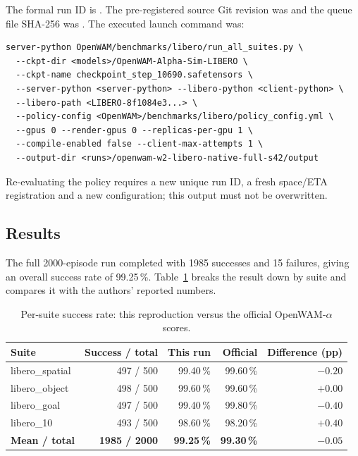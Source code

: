 The formal run ID is . The
pre-registered source Git revision was
and the queue file SHA-256 was
.
The executed launch command was:

\begin{verbatim}
server-python OpenWAM/benchmarks/libero/run_all_suites.py \
  --ckpt-dir <models>/OpenWAM-Alpha-Sim-LIBERO \
  --ckpt-name checkpoint_step_10690.safetensors \
  --server-python <server-python> --libero-python <client-python> \
  --libero-path <LIBERO-8f1084e3...> \
  --policy-config <OpenWAM>/benchmarks/libero/policy_config.yml \
  --gpus 0 --render-gpus 0 --replicas-per-gpu 1 \
  --compile-enabled false --client-max-attempts 1 \
  --output-dir <runs>/openwam-w2-libero-native-full-s42/output
\end{verbatim}

Re-evaluating the policy requires a new unique run ID, a fresh space/ETA
registration and a new configuration; this output must not be overwritten.

\subsection{Results}
\label{sec:owa-results}

The full 2000-episode run completed with 1985 successes and 15 failures, giving
an overall success rate of 99.25\,\%. Table~\ref{tab:owa-scores} breaks the
result down by suite and compares it with the authors' reported numbers.

\begin{table}[H]
  \centering
  \small
  \caption{Per-suite success rate: this reproduction versus the official
  OpenWAM-$\alpha$ scores.}
  \label{tab:owa-scores}
  \begin{tabular}{@{}lrrrr@{}}
    \toprule
    Suite & Success / total & This run & Official & Difference (pp) \\
    \midrule
    libero\_spatial & 497 / 500 & 99.40\,\% & 99.60\,\% & $-0.20$ \\
    libero\_object  & 498 / 500 & 99.60\,\% & 99.60\,\% & $+0.00$ \\
    libero\_goal    & 497 / 500 & 99.40\,\% & 99.80\,\% & $-0.40$ \\
    libero\_10      & 493 / 500 & 98.60\,\% & 98.20\,\% & $+0.40$ \\
    \midrule
    \textbf{Mean / total} & \textbf{1985 / 2000} & \textbf{99.25\,\%} &
    \textbf{99.30\,\%} & $\mathbf{-0.05}$ \\
    \bottomrule
  \end{tabular}
\end{table}


